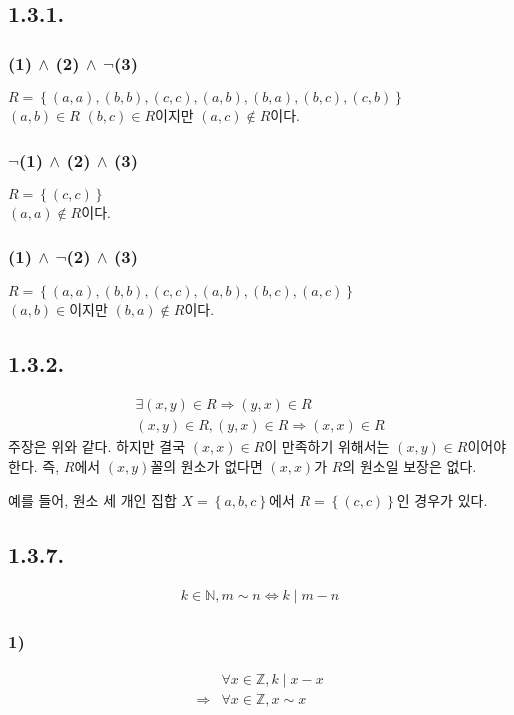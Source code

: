 \documentclass{article}
\begin{document}
\subsection{1.3.1.}
\subsubsection{(1) $\wedge$ (2) $\wedge$ $\lnot$(3)}
$R = \left\{(a, a), (b, b), (c, c), (a, b), (b, a), (b, c), (c, b) \right\}$
\\$(a, b) \in R$ $(b, c) \in R$이지만 $(a, c) \notin R$이다.

\subsubsection{$\lnot$(1) $\wedge$ (2) $\wedge$ (3)}
$R = \left\{(c, c) \right\}$
\\$(a, a) \notin R$이다.

\subsubsection{(1) $\wedge$ $\lnot$(2) $\wedge$ (3)}
$R = \left\{(a, a), (b, b), (c, c), (a, b), (b, c), (a, c) \right\}$
\\$(a, b) \in$이지만 $(b, a) \notin R$이다.

\subsection{1.3.2.}
\begin{align*}
\exists (x, y) \in R \Rightarrow (y, x) \in R
\\ (x, y) \in R, (y, x) \in R \Rightarrow (x, x) \in R
\end{align*}
주장은 위와 같다. 하지만 결국 $(x, x) \in R$이 만족하기 위해서는 $(x, y) \in R$이어야 한다.
즉, $R$에서 $(x, y)$꼴의 원소가 없다면 $(x, x)$가 $R$의 원소일 보장은 없다.

예를 들어, 원소 세 개인 집합 $X = \left\{a, b, c \right\}$에서 $R = \left\{ (c, c) \right\}$인 경우가 있다.
 
\subsection{1.3.7.}
\begin{align*}
k \in \mathbb{N}, m \sim n \iff k \mid m - n
\end{align*}
\subsubsection{1)}
\begin{align*}
&\forall x \in \mathbb{Z}, k \mid x - x
\\ \Rightarrow& \forall x \in \mathbb{Z}, x \sim x
\end{align*}
\end{document}
